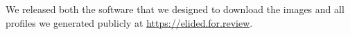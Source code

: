We released both the software that we designed
to download the images and all profiles we generated
publicly at \small{\url{https://elided.for.review}}.

%
%
%
%
%
%
%
